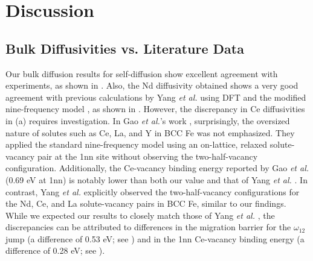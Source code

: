 \documentclass[preprint,12pt]{elsarticle}
\begin{document}
\FloatBarrier
\section{Discussion}

\subsection{Bulk Diffusivities vs. Literature Data}
\label{sec:discussion1}
\noindent Our bulk diffusion results for self-diffusion show excellent agreement with experiments, as shown in . Also, the Nd diffusivity obtained shows a very good agreement with previous calculations by Yang \textit{et al.} \cite{yang_significant_2023} using DFT and the modified nine-frequency model \cite{bocquet_migration_2017}, as shown in . However, the discrepancy in Ce diffusivities in (a) requires investigation.
In Gao \textit{et al.}'s work \cite{GAO2016316}, surprisingly, the oversized nature of solutes such as Ce, La, and Y in BCC Fe was not emphasized. They applied the standard nine-frequency model \cite{leclaire1970} using an on-lattice, relaxed solute-vacancy pair at the 1nn site without observing the two-half-vacancy configuration. Additionally, the Ce-vacancy binding energy reported by Gao \textit{et al.} (0.69 eV at 1nn) is notably lower than both our value and that of Yang \textit{et al.} \cite{yang_significant_2023}.
In contrast, Yang \textit{et al.} \cite{yang_significant_2023} explicitly observed the two-half-vacancy configurations for the Nd, Ce, and La solute-vacancy pairs in BCC Fe, similar to our findings. While we expected our results to closely match those of Yang \textit{et al.} \cite{yang_significant_2023}, the discrepancies can be attributed to differences in the migration barrier for the $\omega_{12}$ jump (a difference of 0.53 eV; see ) and in the 1nn Ce-vacancy binding energy (a difference of 0.28 eV; see ).
\end{document}
